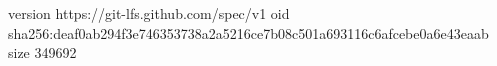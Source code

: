 version https://git-lfs.github.com/spec/v1
oid sha256:deaf0ab294f3e746353738a2a5216ce7b08c501a693116c6afcebe0a6e43eaab
size 349692
